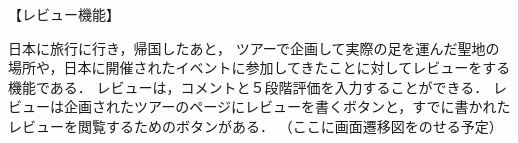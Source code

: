 【レビュー機能】
\par
日本に旅行に行き，帰国したあと，
ツアーで企画して実際の足を運んだ聖地の場所や，日本に開催されたイベントに参加してきたことに対してレビューをする機能である．
レビューは，コメントと５段階評価を入力することができる．
レビューは企画されたツアーのページにレビューを書くボタンと，すでに書かれたレビューを閲覧するためのボタンがある．
（ここに画面遷移図をのせる予定）
